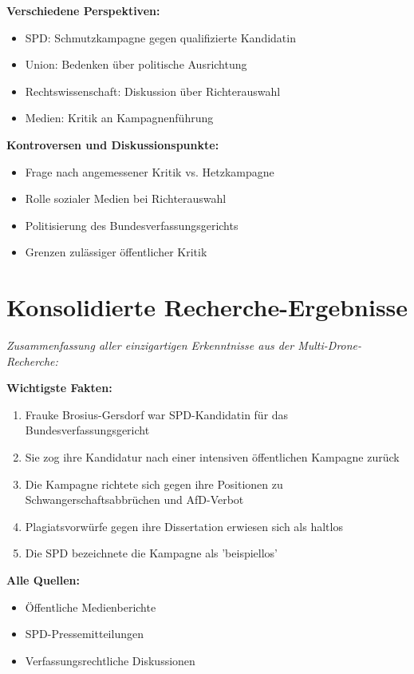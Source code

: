 \documentclass[12pt,a4paper]{article}
\begin{document}
\textbf{Verschiedene Perspektiven:}
\begin{itemize}
\item SPD: Schmutzkampagne gegen qualifizierte Kandidatin
\item Union: Bedenken über politische Ausrichtung
\item Rechtswissenschaft: Diskussion über Richterauswahl
\item Medien: Kritik an Kampagnenführung
\end{itemize}

\textbf{Kontroversen und Diskussionspunkte:}
\begin{itemize}
\item Frage nach angemessener Kritik vs. Hetzkampagne
\item Rolle sozialer Medien bei Richterauswahl
\item Politisierung des Bundesverfassungsgerichts
\item Grenzen zulässiger öffentlicher Kritik
\end{itemize}

\newpage
\section{Konsolidierte Recherche-Ergebnisse}

\textit{Zusammenfassung aller einzigartigen Erkenntnisse aus der Multi-Drone-Recherche:}

\textbf{Wichtigste Fakten:}
\begin{enumerate}
\item Frauke Brosius-Gersdorf war SPD-Kandidatin für das Bundesverfassungsgericht
\item Sie zog ihre Kandidatur nach einer intensiven öffentlichen Kampagne zurück
\item Die Kampagne richtete sich gegen ihre Positionen zu Schwangerschaftsabbrüchen und AfD-Verbot
\item Plagiatsvorwürfe gegen ihre Dissertation erwiesen sich als haltlos
\item Die SPD bezeichnete die Kampagne als 'beispiellos'
\end{enumerate}

\textbf{Alle Quellen:}
\begin{itemize}
\item Öffentliche Medienberichte
\item SPD-Pressemitteilungen
\item Verfassungsrechtliche Diskussionen
\end{itemize}
\end{document}
